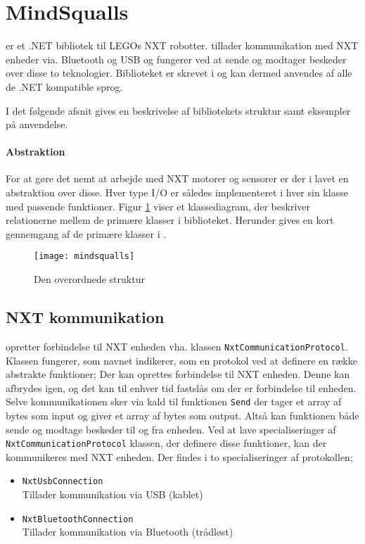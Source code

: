 \section{MindSqualls}
\mindsqualls er et .NET bibliotek til LEGOs NXT robotter.
\mindsqualls tillader kommunikation med NXT enheder via. Bluetooth og USB og fungerer ved at sende og modtager beskeder over disse to teknologier.
Biblioteket er skrevet i \csharp og kan dermed anvendes af alle de .NET kompatible sprog.

I det følgende afsnit gives en beskrivelse af bibliotekets struktur samt eksempler på anvendelse.

\paragraph{Abstraktion}
For at gøre det nemt at arbejde med NXT motorer og sensorer er der i \mindsqualls lavet en abstraktion over disse.
Hver type I/O er således implementeret i hver sin klasse med passende funktioner.
Figur \ref{mindsqualls:structure} viser et klassediagram, der beskriver relationerne mellem de primære klasser i \mindsqualls biblioteket.
Herunder gives en kort gennemgang af de primære klasser i \mindsqualls.

\begin{figure}
\centering
\texttt{[image: mindsqualls]}
\caption{Den overordnede \mindsqualls struktur}
\label{mindsqualls:structure}
\end{figure}

\subsection{NXT kommunikation}
\mindsqualls opretter forbindelse til NXT enheden vha. klassen \lstinline[style=csharp]!NxtCommunicationProtocol!.
Klassen fungerer, som navnet indikerer, som en protokol ved at definere en række abstrakte funktioner;
Der kan oprettes forbindelse til NXT enheden.
Denne kan afbrydes igen, og det kan til enhver tid fastslås om der er forbindelse til enheden.
Selve kommunikationen sker via kald til funktionen \lstinline[style=csharp]!Send! der tager et array af bytes som input og giver et array af bytes som output.
Altså kan funktionen både sende og modtage beskeder til og fra enheden.
Ved at lave specialiseringer af \lstinline[style=csharp]!NxtCommunicationProtocol! klassen, der definere disse funktioner, kan der kommunikeres med NXT enheden.
Der findes i \mindsqualls to specialiseringer af protokollen;
\begin{itemize}
\item \lstinline[style=csharp]!NxtUsbConnection!\\
Tillader kommunikation via USB (kablet)
\item \lstinline[style=csharp]!NxtBluetoothConnection!\\
Tillader kommunikation via Bluetooth (trådløst)
\end{itemize}
